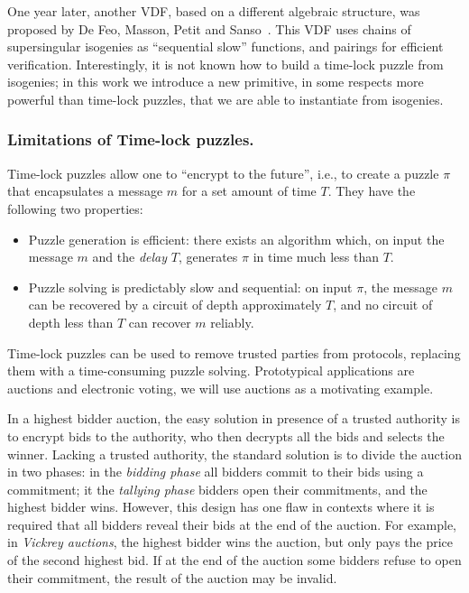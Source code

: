 \documentclass{llncs}
\begin{document}
One year later, another VDF, based on a different algebraic structure,
was proposed by De Feo, Masson, Petit and
Sanso~\cite{10.1007/978-3-030-34578-5_10}. %
This VDF uses chains of supersingular isogenies as ``sequential slow''
functions, and pairings for efficient verification. %
Interestingly, it is not known how to build a time-lock puzzle from
isogenies; in this work we introduce a new primitive, in some respects
more powerful than time-lock puzzles, that we are able to instantiate
from isogenies.

\subsubsection{Limitations of Time-lock puzzles.}
Time-lock puzzles allow one to ``encrypt to the future'', i.e., to
create a puzzle $\pi$ that encapsulates a message $m$ for a set amount
of time $T$. %
They have the following two properties:
\begin{itemize}
\item Puzzle generation is efficient: there exists an algorithm which,
  on input the message $m$ and the \emph{delay} $T$, generates $\pi$
  in time much less than $T$.
\item Puzzle solving is predictably slow and sequential: on input
  $\pi$, the message $m$ can be recovered by a circuit of depth
  approximately $T$, and no circuit of depth less than $T$ can
  recover $m$ reliably.
\end{itemize}

Time-lock puzzles can be used to remove trusted parties from
protocols, replacing them with a time-consuming puzzle solving. %
Prototypical applications are auctions and electronic voting, we will
use auctions as a motivating example.

In a highest bidder auction, the easy solution in presence of a
trusted authority is to encrypt bids to the authority, who then
decrypts all the bids and selects the winner. %
Lacking a trusted authority, the standard solution is to divide the
auction in two phases: in the \emph{bidding phase} all bidders commit
to their bids using a commitment; it the \emph{tallying phase} bidders
open their commitments, and the highest bidder wins. %
However, this design has one flaw in contexts where it is required
that all bidders reveal their bids at the end of the auction. %
For example, in \emph{Vickrey auctions}, the highest bidder wins the
auction, but only pays the price of the second highest bid. %
If at the end of the auction some bidders refuse to open their
commitment, the result of the auction may be invalid.
\end{document}
